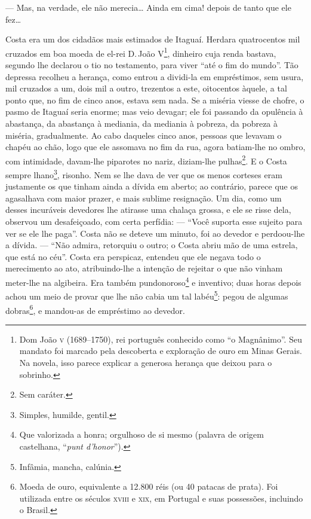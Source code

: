 --- Mas, na verdade, ele não merecia\ldots{} Ainda em cima! depois de
tanto que ele fez\ldots{}

Costa era um dos cidadãos mais estimados de Itaguaí. Herdara
quatrocentos mil cruzados em boa moeda de el-rei D.\,João \textsc{V}\footnote{Dom
  João \textsc{v} (1689--1750), rei português conhecido como ``o Magnânimo''. Seu
  mandato foi marcado pela descoberta e exploração de ouro em Minas
  Gerais. Na novela, isso parece explicar a generosa herança que deixou
  para o sobrinho.}, dinheiro cuja renda bastava, segundo lhe declarou o
tio no testamento, para viver ``até o fim do mundo''. Tão depressa
recolheu a herança, como entrou a dividi-la em empréstimos, sem usura,
mil cruzados a um, dois mil a outro, trezentos a este, oitocentos
àquele, a tal ponto que, no fim de cinco anos, estava sem nada. Se a
miséria viesse de chofre, o pasmo de Itaguaí seria enorme; mas veio
devagar; ele foi passando da opulência à abastança, da abastança à
mediania, da mediania à pobreza, da pobreza à miséria, gradualmente. Ao
cabo daqueles cinco anos, pessoas que levavam o chapéu ao chão, logo que
ele assomava no fim da rua, agora batiam-lhe no ombro, com intimidade,
davam-lhe piparotes no nariz, diziam-lhe pulhas\footnote{Sem caráter.}.
E o Costa sempre lhano\footnote{Simples, humilde, gentil.}, risonho. Nem
se lhe dava de ver que os menos corteses eram justamente os que tinham
ainda a dívida em aberto; ao contrário, parece que os agasalhava com
maior prazer, e mais sublime resignação. Um dia, como um desses
incuráveis devedores lhe atirasse uma chalaça grossa, e ele se risse
dela, observou um desafeiçoado, com certa perfídia: --- ``Você suporta
esse sujeito para ver se ele lhe paga''. Costa não se deteve um minuto,
foi ao devedor e perdoou-lhe a dívida. --- ``Não admira, retorquiu o
outro; o Costa abriu mão de uma estrela, que está no céu''. Costa era
perspicaz, entendeu que ele negava todo o merecimento ao ato,
atribuindo-lhe a intenção de rejeitar o que não vinham meter-lhe na
algibeira. Era também pundonoroso\footnote{Que valorizada a honra;
  orgulhoso de si mesmo (palavra de origem castelhana, ``\emph{punt
  d'honor}'').} e inventivo; duas horas depois achou um meio de provar
que lhe não cabia um tal labéu\footnote{Infâmia, mancha, calúnia.}:
pegou de algumas dobras\footnote{Moeda de ouro, equivalente a 12.800
  réis (ou 40 patacas de prata). Foi utilizada entre os séculos \textsc{xviii} e
  \textsc{xix}, em Portugal e suas possessões, incluindo o Brasil.}, e mandou-as
de empréstimo ao devedor.

